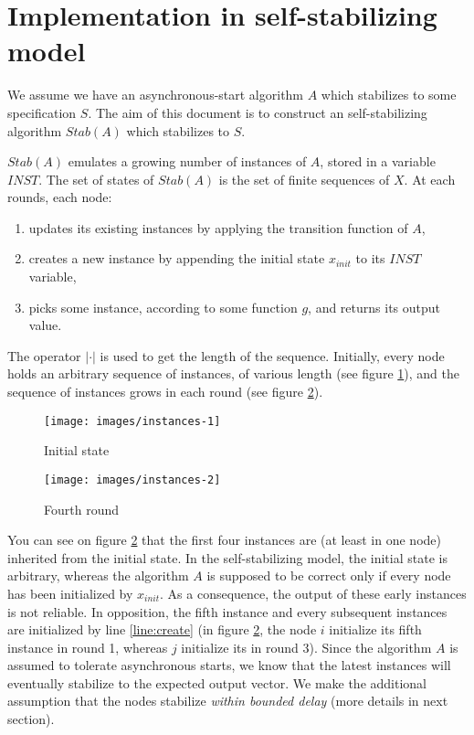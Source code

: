 \documentclass[11pt,letterpaper]{article}
\begin{document}
\section{Implementation in self-stabilizing model}

We assume we have an asynchronous-start algorithm $A$ which stabilizes to some specification $S$.
The aim of this document is to construct an self-stabilizing algorithm $Stab(A)$ which stabilizes to $S$.

$Stab(A)$ emulates a growing number of instances of $A$, stored in a variable $INST$.
The set of states of $Stab(A)$ is the set of finite sequences of $X$.
At each rounds, each node:
\begin{enumerate}
	\item updates its existing instances by applying the transition function of $A$,
	\item creates a new instance by appending the initial state $x_{init}$ to its $INST$ variable,
	\item picks some instance, according to some function $g$, and returns its output value.
\end{enumerate}

The operator $|\cdot|$ is used to get the length of the sequence.
Initially, every node holds an arbitrary sequence of instances, of various length (see figure \ref{fig:fig1}), and the sequence of instances grows in each round (see figure \ref{fig:fig2}).

\begin{figure}[h!]
	\texttt{[image: images/instances-1]}
	\caption{Initial state}
	\label{fig:fig1}
\end{figure}

\begin{figure}[h!]
	\texttt{[image: images/instances-2]}
	\caption{Fourth round}
	\label{fig:fig2}
\end{figure}

You can see on figure \ref{fig:fig2} that the first four instances are (at least in one node) inherited from the initial state.
In the self-stabilizing model, the initial state is arbitrary, whereas the algorithm $A$ is supposed to be correct only if every node has been initialized by $x_{init}$.
As a consequence, the output of these early instances is not reliable.
In opposition, the fifth instance and every subsequent instances are initialized by line \ref{line:create}
(in figure \ref{fig:fig2}, the node $i$ initialize its fifth instance in round 1, whereas $j$ initialize its in round 3).
Since the algorithm $A$ is assumed to tolerate asynchronous starts, we know that the latest instances will eventually stabilize to the expected output vector.
We make the additional assumption that the nodes stabilize \textit{within bounded delay} (more details in next section).
\end{document}
